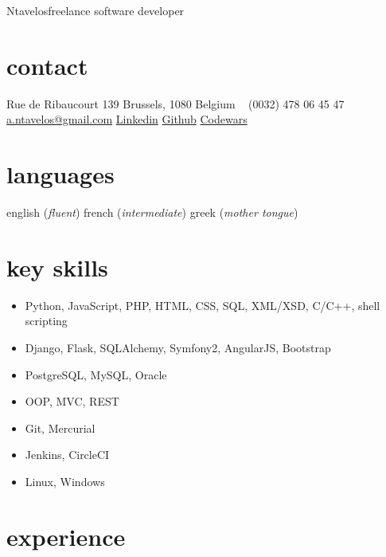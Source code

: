 \documentclass[]{friggeri-cv} %
\begin{document}
 {Ntavelos}{freelance software developer} %


\begin{aside} %
\section{contact}
Rue de Ribaucourt 139
Brussels, 1080
Belgium
~
(0032) 478 06 45 47
~
\href{mailto:a.ntavelos@gmail.com}{a.ntavelos@gmail.com}
\href{http://www.linkedin.com/in/antavelos}{Linkedin}
\href{https://github.com/antavelos}{Github}
\href{http://www.codewars.com/users/dvc}{Codewars}
\section{languages}
english (\textit{fluent})
french (\textit{intermediate})
greek (\textit{mother tongue})
\end{aside}


\section{key skills}
\begin{itemize}
\item Python, JavaScript, PHP, HTML, CSS, SQL, XML/XSD, C/C++, shell scripting
\item Django, Flask, SQLAlchemy, Symfony2, AngularJS, Bootstrap
\item PostgreSQL, MySQL, Oracle
\item OOP, MVC, REST
\item Git, Mercurial
\item Jenkins, CircleCI
\item Linux, Windows
\end{itemize}

\section{experience}
\end{document}
